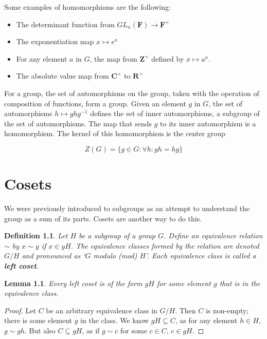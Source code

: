 \documentclass[12pt]{report}
\newtheorem{lemma}[theorem]{Lemma}
\newtheorem{definition}{Definition}
\begin{document}
Some examples of homomorphisms are the following:
\begin{itemize}
    \item The determinant function from $GL_n(\mathbf{F}) \to \mathbf{F}^\times$
    \item The exponentiation map $x \mapsto e^x$
    \item For any element $a$ in $G$, the map from $\mathbf{Z}^+$ defined by $x \mapsto a^x$.
    \item The absolute value map from $\mathbf{C}^\times$ to $\mathbf{R}^\times$
\end{itemize}
 
For a group, the set of automorphisms on the group, taken with the operation of composition of functions, form a group. Given an element $g$ in $G$, the set of automorphisms $h \mapsto ghg^{-1}$ defines the set of inner automorphisms, a subgroup of the set of automorphisms. The map that sends $g$ to its inner automorphism is a homomorphism. The kernel of this homomorphism is the center group

\[Z(G) = \{ g \in G : \forall h: gh = hg \}\]

\chapter{Cosets}

We were previously introduced to subgroups as an attempt to understand the group as a sum of its parts. Cosets are another way to do this.

\begin{definition}
    Let $H$ be a subgroup of a group $G$. Define an equivalence relation $\sim$ by $x \sim y$ if $x \in yH$. The equivalence classes formed by the relation are denoted $G/H$ and pronounced as `$G$ modulo (mod) $H$'. Each equivalence class is called a {\bf left coset}.
\end{definition}

\begin{lemma}
    Every left coset is of the form $gH$ for some element $g$ that is in the equivalence class.
\end{lemma}
\begin{proof}
    Let $C$ be an arbitrary equivalence class in $G/H$. Then $C$ is non-empty; there is some element $g$ in the class. We know $gH \subseteq C$, as for any element $h \in H$, $g \sim gh$. But also $C \subseteq gH$, as if $g \sim c$ for some $c \in C$, $c \in gH$.
\end{proof}
\end{document}
